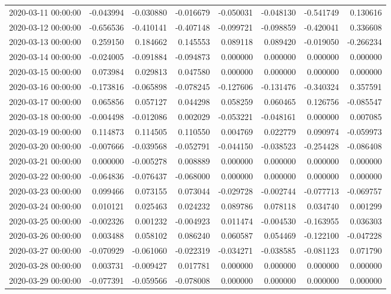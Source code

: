 \begin{tabular}{lrrrrrrr}
2020-03-11 00:00:00 & -0.043994 & -0.030880 & -0.016679 & -0.050031 & -0.048130 & -0.541749 & 0.130616 \\
2020-03-12 00:00:00 & -0.656536 & -0.410141 & -0.407148 & -0.099721 & -0.098859 & -0.420041 & 0.336608 \\
2020-03-13 00:00:00 & 0.259150 & 0.184662 & 0.145553 & 0.089118 & 0.089420 & -0.019050 & -0.266234 \\
2020-03-14 00:00:00 & -0.024005 & -0.091884 & -0.094873 & 0.000000 & 0.000000 & 0.000000 & 0.000000 \\
2020-03-15 00:00:00 & 0.073984 & 0.029813 & 0.047580 & 0.000000 & 0.000000 & 0.000000 & 0.000000 \\
2020-03-16 00:00:00 & -0.173816 & -0.065898 & -0.078245 & -0.127606 & -0.131476 & -0.340324 & 0.357591 \\
2020-03-17 00:00:00 & 0.065856 & 0.057127 & 0.044298 & 0.058259 & 0.060465 & 0.126756 & -0.085547 \\
2020-03-18 00:00:00 & -0.004498 & -0.012086 & 0.002029 & -0.053221 & -0.048161 & 0.000000 & 0.007085 \\
2020-03-19 00:00:00 & 0.114873 & 0.114505 & 0.110550 & 0.004769 & 0.022779 & 0.090974 & -0.059973 \\
2020-03-20 00:00:00 & -0.007666 & -0.039568 & -0.052791 & -0.044150 & -0.038523 & -0.254428 & -0.086408 \\
2020-03-21 00:00:00 & 0.000000 & -0.005278 & 0.008889 & 0.000000 & 0.000000 & 0.000000 & 0.000000 \\
2020-03-22 00:00:00 & -0.064836 & -0.076437 & -0.068000 & 0.000000 & 0.000000 & 0.000000 & 0.000000 \\
2020-03-23 00:00:00 & 0.099466 & 0.073155 & 0.073044 & -0.029728 & -0.002744 & -0.077713 & -0.069757 \\
2020-03-24 00:00:00 & 0.010121 & 0.025463 & 0.024232 & 0.089786 & 0.078118 & 0.034740 & 0.001299 \\
2020-03-25 00:00:00 & -0.002326 & 0.001232 & -0.004923 & 0.011474 & -0.004530 & -0.163955 & 0.036303 \\
2020-03-26 00:00:00 & 0.003488 & 0.058102 & 0.086240 & 0.060587 & 0.054469 & -0.122100 & -0.047228 \\
2020-03-27 00:00:00 & -0.070929 & -0.061060 & -0.022319 & -0.034271 & -0.038585 & -0.081123 & 0.071790 \\
2020-03-28 00:00:00 & 0.003731 & -0.009427 & 0.017781 & 0.000000 & 0.000000 & 0.000000 & 0.000000 \\
2020-03-29 00:00:00 & -0.077391 & -0.059566 & -0.078008 & 0.000000 & 0.000000 & 0.000000 & 0.000000 \\

\end{tabular}
